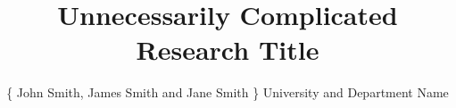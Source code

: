 \usepackage{graphicx}
    \graphicspath{{figures/}}
\usepackage{amsmath}
\usepackage{amssymb}
\usepackage{booktabs} %
\usepackage{enumitem} %
\usepackage{palatino} %
\usepackage[font=small,labelfont=bf]{caption} %
\usepackage{multicol}
    \setlength{\columnsep}{1.5em} %
    \setlength{\columnseprule}{0mm} %
\usepackage{tikz} %
    \usetikzlibrary{shapes,arrows} %
\usepackage{filecontents}







\newcommand{\compresslist}{%
\setlength{\itemsep}{1pt}
\setlength{\parskip}{0pt}
\setlength{\parsep}{0pt}
}




\title{Unnecessarily Complicated Research Title}
\author{\{ John Smith, James Smith and Jane Smith \} \hspace{12pt} University and Department Name}

